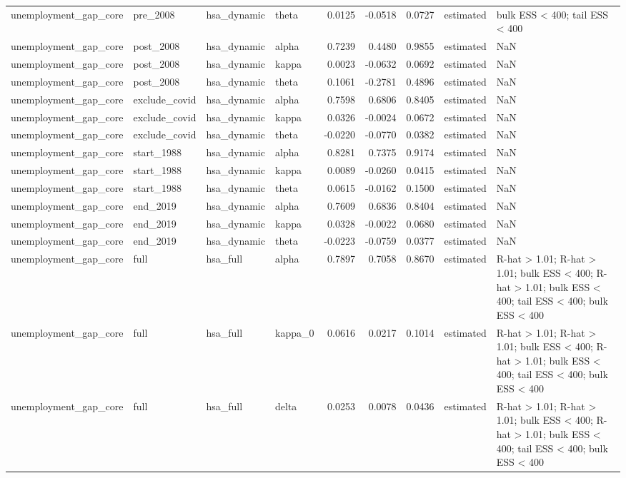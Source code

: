 \begin{tabular}{llllrrrll}
unemployment\_gap\_core & pre\_2008 & hsa\_dynamic & theta & 0.0125 & -0.0518 & 0.0727 & estimated & bulk ESS < 400; tail ESS < 400 \\
unemployment\_gap\_core & post\_2008 & hsa\_dynamic & alpha & 0.7239 & 0.4480 & 0.9855 & estimated & NaN \\
unemployment\_gap\_core & post\_2008 & hsa\_dynamic & kappa & 0.0023 & -0.0632 & 0.0692 & estimated & NaN \\
unemployment\_gap\_core & post\_2008 & hsa\_dynamic & theta & 0.1061 & -0.2781 & 0.4896 & estimated & NaN \\
unemployment\_gap\_core & exclude\_covid & hsa\_dynamic & alpha & 0.7598 & 0.6806 & 0.8405 & estimated & NaN \\
unemployment\_gap\_core & exclude\_covid & hsa\_dynamic & kappa & 0.0326 & -0.0024 & 0.0672 & estimated & NaN \\
unemployment\_gap\_core & exclude\_covid & hsa\_dynamic & theta & -0.0220 & -0.0770 & 0.0382 & estimated & NaN \\
unemployment\_gap\_core & start\_1988 & hsa\_dynamic & alpha & 0.8281 & 0.7375 & 0.9174 & estimated & NaN \\
unemployment\_gap\_core & start\_1988 & hsa\_dynamic & kappa & 0.0089 & -0.0260 & 0.0415 & estimated & NaN \\
unemployment\_gap\_core & start\_1988 & hsa\_dynamic & theta & 0.0615 & -0.0162 & 0.1500 & estimated & NaN \\
unemployment\_gap\_core & end\_2019 & hsa\_dynamic & alpha & 0.7609 & 0.6836 & 0.8404 & estimated & NaN \\
unemployment\_gap\_core & end\_2019 & hsa\_dynamic & kappa & 0.0328 & -0.0022 & 0.0680 & estimated & NaN \\
unemployment\_gap\_core & end\_2019 & hsa\_dynamic & theta & -0.0223 & -0.0759 & 0.0377 & estimated & NaN \\
unemployment\_gap\_core & full & hsa\_full & alpha & 0.7897 & 0.7058 & 0.8670 & estimated & R-hat > 1.01; R-hat > 1.01; bulk ESS < 400; R-hat > 1.01; bulk ESS < 400; tail ESS < 400; bulk ESS < 400 \\
unemployment\_gap\_core & full & hsa\_full & kappa\_0 & 0.0616 & 0.0217 & 0.1014 & estimated & R-hat > 1.01; R-hat > 1.01; bulk ESS < 400; R-hat > 1.01; bulk ESS < 400; tail ESS < 400; bulk ESS < 400 \\
unemployment\_gap\_core & full & hsa\_full & delta & 0.0253 & 0.0078 & 0.0436 & estimated & R-hat > 1.01; R-hat > 1.01; bulk ESS < 400; R-hat > 1.01; bulk ESS < 400; tail ESS < 400; bulk ESS < 400 \\

\end{tabular}
